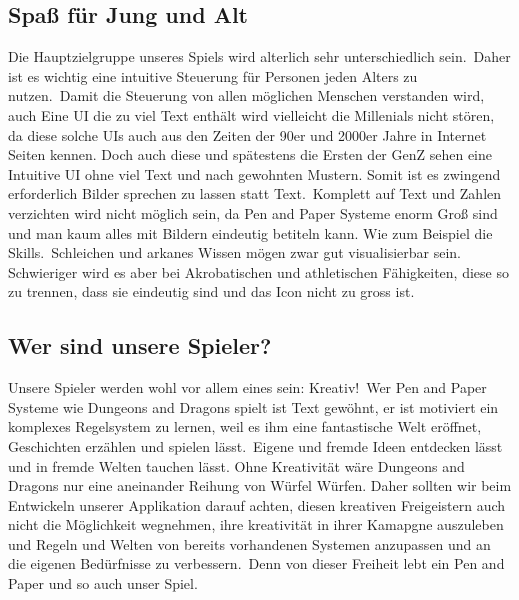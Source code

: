 \subsection{Spaß für Jung und Alt}\label{subsec:fun_for_all_ages}
Die Hauptzielgruppe unseres Spiels wird alterlich sehr unterschiedlich sein.\ Daher ist es wichtig eine intuitive
Steuerung für Personen jeden Alters zu nutzen.\ Damit die Steuerung von allen möglichen Menschen verstanden wird, auch
Eine UI die zu viel Text enthält wird vielleicht die Millenials nicht stören, da diese solche UIs auch aus den Zeiten
der 90er und 2000er Jahre in Internet Seiten kennen.
Doch auch diese und spätestens die Ersten der GenZ sehen eine Intuitive UI ohne viel Text und nach gewohnten Mustern.
Somit ist es zwingend erforderlich Bilder sprechen zu lassen statt Text.\ Komplett auf Text und Zahlen verzichten wird
nicht möglich sein, da Pen and Paper Systeme enorm Groß sind und man kaum alles mit Bildern eindeutig betiteln kann.
Wie zum Beispiel die Skills.\ Schleichen und arkanes Wissen mögen zwar gut visualisierbar sein.
Schwieriger wird es aber bei Akrobatischen und athletischen Fähigkeiten, diese so zu trennen, dass sie eindeutig sind
und das Icon nicht zu gross ist.

\subsection{Wer sind unsere Spieler?}\label{subsec:who_is_your_player}
Unsere Spieler werden wohl vor allem eines sein: Kreativ!\ Wer Pen and Paper Systeme wie Dungeons and Dragons spielt
ist Text gewöhnt, er ist motiviert ein komplexes Regelsystem zu lernen, weil es ihm eine fantastische Welt eröffnet,
Geschichten erzählen und spielen lässt.\ Eigene und fremde Ideen entdecken lässt und in fremde Welten tauchen lässt.
Ohne Kreativität wäre Dungeons and Dragons nur eine aneinander Reihung von Würfel Würfen.
Daher sollten wir beim Entwickeln unserer Applikation darauf achten, diesen kreativen Freigeistern auch nicht die
Möglichkeit wegnehmen, ihre kreativität in ihrer Kamapgne auszuleben und Regeln und Welten von bereits vorhandenen
Systemen anzupassen und an die eigenen Bedürfnisse zu verbessern.\ Denn von dieser Freiheit lebt ein Pen and Paper
und so auch unser Spiel.